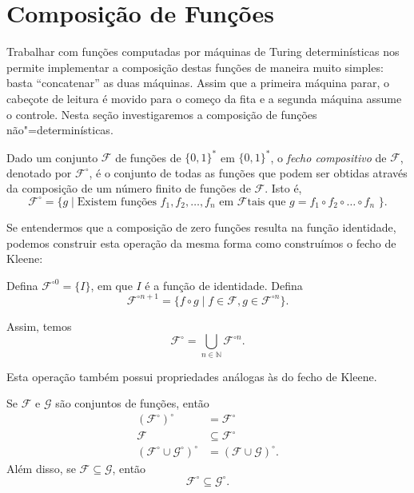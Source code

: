 \section{Composição de Funções}
\label{sec:function_composition}

Trabalhar com funções computadas por máquinas de Turing determinísticas
nos permite implementar a composição destas funções de maneira muito simples:
basta ``concatenar'' as duas máquinas.
Assim que a primeira máquina parar,
o cabeçote de leitura é movido para o começo da fita
e a segunda máquina assume o controle.
Nesta seção investigaremos a composição de funções não"=determinísticas.

\begin{definition}
    Dado um conjunto $\mathcal F$ de funções de $\{0, 1\}^*$ em $\{0, 1\}^*$,
    o \emph{fecho compositivo} de $\mathcal F$,
    denotado por $\mathcal F^\circ$,
    é o conjunto de todas as funções que podem ser obtidas
    através da composição de um número finito de funções de $\mathcal F$.
    Isto é,
    \begin{equation*}
        \mathcal F^\circ = \{g \mid
            \text{Existem funções $f_1, f_2, \dots, f_n$ em $\mathcal F$
                tais que $g = f_1 \circ f_2 \circ \dots \circ f_n$
            }
        \}.
    \end{equation*}
\end{definition}

Se entendermos que a composição de zero funções resulta
na função identidade,
podemos construir esta operação da mesma forma como construímos o fecho de Kleene:

Defina $\mathcal F^{\circ 0} = \{I\}$,
em que $I$ é a função de identidade.
Defina
\begin{equation*}
    \mathcal F^{\circ n+1} = \{ f \circ g \mid
        f \in \mathcal F, g \in \mathcal F^{\circ n}
    \}.
\end{equation*}

Assim, temos
\begin{equation*}
    \mathcal F^\circ = \bigcup_{n \in \mathbb N} \mathcal F^{\circ n}.
\end{equation*}

Esta operação também possui propriedades análogas às do fecho de Kleene.

\begin{proposition}
    Se $\mathcal F$ e $\mathcal G$ são conjuntos de funções, então
    \begin{align*}
        (\mathcal F^\circ)^\circ &= \mathcal F^\circ \\
        \mathcal F &\subseteq \mathcal F^\circ \\
        (\mathcal F^\circ \cup \mathcal G^\circ)^\circ &=
            (\mathcal F \cup \mathcal G)^\circ.
    \end{align*}
    Além disso, se $\mathcal F \subseteq \mathcal G$,
    então
    \begin{equation*}
        \mathcal F^\circ \subseteq \mathcal G^\circ.
    \end{equation*}
    \label{thm:compositive_closure_properties}
\end{proposition}

